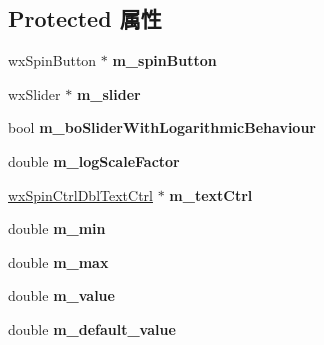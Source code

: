 \subsection*{Protected 属性}
\begin{DoxyCompactItemize}
\item 
\hypertarget{classwx_spin_ctrl_dbl_a20b462d42c5eea2264cd6bc1f0f636d3}{wx\+Spin\+Button $\ast$ {\bfseries m\+\_\+spin\+Button}}\label{classwx_spin_ctrl_dbl_a20b462d42c5eea2264cd6bc1f0f636d3}

\item 
\hypertarget{classwx_spin_ctrl_dbl_a5267a1e3993286283a0170b4a9f7d472}{wx\+Slider $\ast$ {\bfseries m\+\_\+slider}}\label{classwx_spin_ctrl_dbl_a5267a1e3993286283a0170b4a9f7d472}

\item 
\hypertarget{classwx_spin_ctrl_dbl_a4f30fe3b44579be5144d4bb18ce4e572}{bool {\bfseries m\+\_\+bo\+Slider\+With\+Logarithmic\+Behaviour}}\label{classwx_spin_ctrl_dbl_a4f30fe3b44579be5144d4bb18ce4e572}

\item 
\hypertarget{classwx_spin_ctrl_dbl_a9c4346e52fcc9deb335f936b9e9d8d2a}{double {\bfseries m\+\_\+log\+Scale\+Factor}}\label{classwx_spin_ctrl_dbl_a9c4346e52fcc9deb335f936b9e9d8d2a}

\item 
\hypertarget{classwx_spin_ctrl_dbl_a68d8cda00021a6fdb14c52d3ad46a66e}{\hyperlink{classwx_spin_ctrl_dbl_text_ctrl}{wx\+Spin\+Ctrl\+Dbl\+Text\+Ctrl} $\ast$ {\bfseries m\+\_\+text\+Ctrl}}\label{classwx_spin_ctrl_dbl_a68d8cda00021a6fdb14c52d3ad46a66e}

\item 
\hypertarget{classwx_spin_ctrl_dbl_a2dcdd6a29ffb8c01134e27d836d1883a}{double {\bfseries m\+\_\+min}}\label{classwx_spin_ctrl_dbl_a2dcdd6a29ffb8c01134e27d836d1883a}

\item 
\hypertarget{classwx_spin_ctrl_dbl_adeedac5358bf2529ff9d1110849416db}{double {\bfseries m\+\_\+max}}\label{classwx_spin_ctrl_dbl_adeedac5358bf2529ff9d1110849416db}

\item 
\hypertarget{classwx_spin_ctrl_dbl_ad211bdad1ea185787528b890258539e2}{double {\bfseries m\+\_\+value}}\label{classwx_spin_ctrl_dbl_ad211bdad1ea185787528b890258539e2}

\item 
\hypertarget{classwx_spin_ctrl_dbl_abeab66f509189f686c036b4cca84a73f}{double {\bfseries m\+\_\+default\+\_\+value}}\label{classwx_spin_ctrl_dbl_abeab66f509189f686c036b4cca84a73f}


\end{DoxyCompactItemize}
